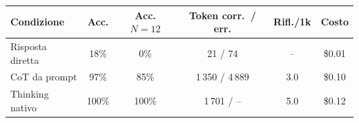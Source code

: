 \begin{tabular}{lccccc}
\toprule
Condizione & Acc. & Acc. $N{=}12$ & Token corr.\ / err. & Rifl./1k & Costo \\
\midrule
Risposta diretta & 18\% & 0\% & 21 / 74 & -- & \$0.01 \\
CoT da prompt & 97\% & 85\% & 1\,350 / 4\,889 & 3.0 & \$0.10 \\
Thinking nativo & 100\% & 100\% & 1\,701 / -- & 5.0 & \$0.12 \\
\bottomrule
\end{tabular}
